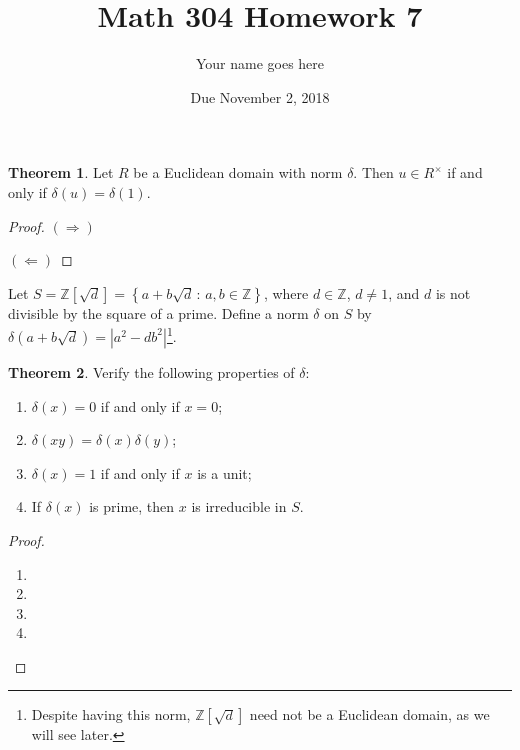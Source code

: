 \documentclass[11pt]{article}		%
\title{Math 304 Homework 7}
\author{Your name goes here}
\date{Due November 2, 2018}
\def\Z{{\mathbb Z}}
\theoremstyle{definition}
\newtheorem{theorem}{Theorem}
\def\setof#1#2{{\left\{#1\,\colon\,#2\right\}}}
\begin{document}
\maketitle


\begin{theorem}
	Let $R$ be a Euclidean domain with norm $\delta$.
	Then $u\in R^\times$ if and only if $\delta(u) = \delta(1)$.
\end{theorem}

\begin{proof}
	$(\Rightarrow)$
	
	\medskip
	
	$(\Leftarrow)$
	
\end{proof}


Let $S = \Z[\sqrt{d}] = \setof{a+b\sqrt{d}}{a,b\in\Z}$, where $d\in \Z$, $d\ne 1$, and $d$ is not divisible by the square of a prime.
Define a norm $\delta$ on $S$ by $\delta(a+b\sqrt{d}) = |a^2 - db^2|$\footnote{Despite having this norm, $\Z[\sqrt{d}]$ need not be a Euclidean domain, as we will see later.}.


\begin{theorem}
	Verify the following properties of $\delta$:
	\begin{enumerate}
		\item $\delta(x) = 0$ if and only if $x = 0$;
		\item $\delta(xy) = \delta(x)\delta(y)$;
		\item $\delta(x) = 1$ if and only if $x$ is a unit;
		\item If $\delta(x)$ is prime, then $x$ is irreducible in $S$.
	\end{enumerate}
\end{theorem}

\begin{proof}
\
\begin{enumerate}

	\item 
	
	\item 
	
	\item 
	
	\item 

\end{enumerate}
\end{proof}
 
\end{document}

